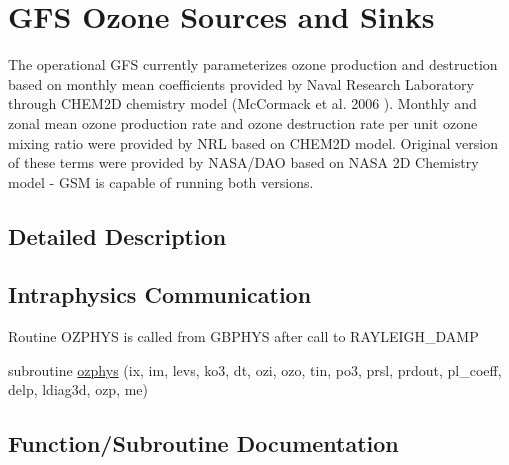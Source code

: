 \hypertarget{group___g_f_s__ozn}{}\section{G\+FS Ozone Sources and Sinks}
\label{group___g_f_s__ozn}


The operational G\+FS currently parameterizes ozone production and destruction based on monthly mean coefficients provided by Naval Research Laboratory through C\+H\+E\+M2D chemistry model (Mc\+Cormack et al. 2006 \cite{mccormack_et_al_2006}). Monthly and zonal mean ozone production rate and ozone destruction rate per unit ozone mixing ratio were provided by N\+RL based on C\+H\+E\+M2D model. Original version of these terms were provided by N\+A\+S\+A/\+D\+AO based on N\+A\+SA 2D Chemistry model -\/ G\+SM is capable of running both versions.  




\subsection{Detailed Description}
\hypertarget{group___g_f_s__ozn_intra_oz}{}\subsection{Intraphysics Communication}\label{group___g_f_s__ozn_intra_oz}

\begin{DoxyItemize}
\item Routine O\+Z\+P\+H\+YS is called from G\+B\+P\+H\+YS after call to R\+A\+Y\+L\+E\+I\+G\+H\+\_\+\+D\+A\+MP 
\end{DoxyItemize}\begin{DoxyCompactItemize}
\item 
subroutine \hyperlink{group___g_f_s__ozn_ga1994c35a0e329143943d83bd22ee9497}{ozphys} (ix, im, levs, ko3, dt, ozi, ozo, tin, po3, prsl, prdout, pl\+\_\+coeff, delp, ldiag3d, ozp, me)
\end{DoxyCompactItemize}


\subsection{Function/\+Subroutine Documentation}
\mbox{\label{group___g_f_s__ozn_ga1994c35a0e329143943d83bd22ee9497}} 

